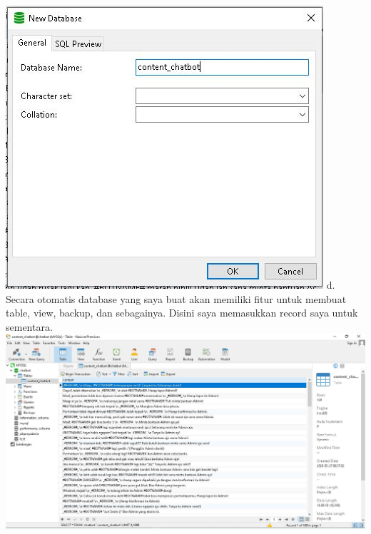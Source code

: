 \documentclass{article}
\newcounter{saveenumi}
\newcommand{\seti}{\setcounter{saveenumi}{\value{enumi}}} %
\begin{document}
\begin{enumerate}
        \includegraphics[scale=0.6]{26.5c.jpg}
        \newline
        d. Secara otomatis database yang  saya buat akan memiliki fitur untuk membuat table, view, backup, dan sebagainya. Disini saya memasukkan record saya untuk sementara.
        \newline
        \includegraphics[scale=0.3]{26.5d.jpg}
        \newline
        \seti %
    \end{enumerate}
\end{document}
